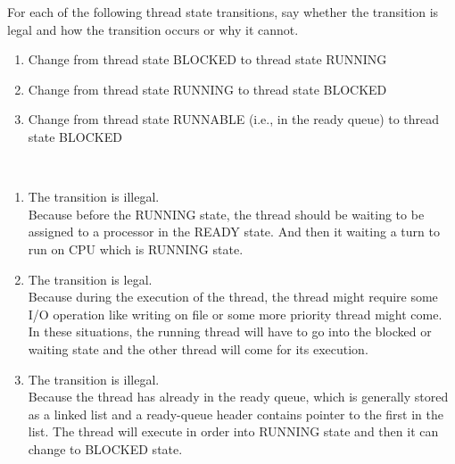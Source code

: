 \documentclass[12pt]{article}
\newenvironment{sol}[1][Solution]{\begin{trivlist}\item[\hskip\labelsep {\bfseries #1:}]}{\end{trivlist}}
\begin{document}
\begin{enumerate}
\newpage
\item For each of the following thread state transitions, say whether the transition is legal and how the transition occurs or why it cannot.
\begin{enumerate}
    \item Change from thread state BLOCKED to thread state RUNNING
    \item Change from thread state RUNNING to thread state BLOCKED
    \item Change from thread state RUNNABLE (i.e., in the ready queue) to thread state BLOCKED
\end{enumerate}
\begin{sol}
    ~\
    \begin{enumerate}
        \item The transition is illegal.\\
        Because before the RUNNING state, the thread should be waiting to be assigned to a processor in the READY state. And then it waiting a turn to run on CPU which is RUNNING state.
        \item The transition is legal.\\
        Because during the execution of the thread, the thread might require some I/O operation like writing on file or some more priority thread might come. In these situations, the running thread will have to go into the blocked or waiting state and the other thread will come for its execution. 
        \item The transition is illegal.\\
        Because the thread has already in the ready queue, which is generally stored as a linked list and a ready-queue header contains pointer to the first in the list. The thread will execute in order into RUNNING state and then it can change to BLOCKED state.
    \end{enumerate}
\end{sol}


\end{enumerate}
\end{document}
